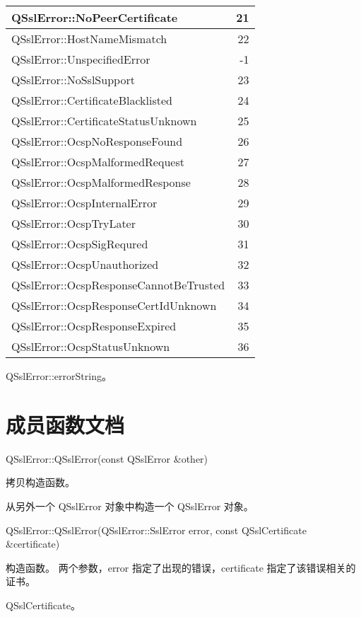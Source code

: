 \begin{longtable}[l]{|l|r|}
\hline
QSslError::NoPeerCertificate &	21 \\ 
\hline
QSslError::HostNameMismatch &	22 \\ 
\hline
QSslError::UnspecifiedError &	-1 \\ 
\hline
QSslError::NoSslSupport 	&23 \\  
\hline
QSslError::CertificateBlacklisted &	24 \\ 
\hline
QSslError::CertificateStatusUnknown &	25 \\ 
\hline
QSslError::OcspNoResponseFound &	26 \\ 
\hline
QSslError::OcspMalformedRequest &	27 \\ 
\hline
QSslError::OcspMalformedResponse &	28 \\ 
\hline
QSslError::OcspInternalError &	29 \\ 
\hline
QSslError::OcspTryLater &	30 \\ 
\hline
QSslError::OcspSigRequred &	31 \\ 
\hline
QSslError::OcspUnauthorized &	32 \\ 
\hline
QSslError::OcspResponseCannotBeTrusted &	33 \\ 
\hline
QSslError::OcspResponseCertIdUnknown &	34 \\ 
\hline
QSslError::OcspResponseExpired& 	35 \\
\hline
QSslError::OcspStatusUnknown &	36 \\ 
\hline 
\end{longtable}

\begin{seeAlso}
QSslError::errorString。
\end{seeAlso}

\section{成员函数文档}

QSslError::QSslError(const QSslError \&other)

拷贝构造函数。

从另外一个 QSslError 对象中构造一个 QSslError 对象。

QSslError::QSslError(QSslError::SslError error, const QSslCertificate \&certificate)

构造函数。
两个参数，error 指定了出现的错误，certificate 指定了该错误相关的证书。

\begin{seeAlso}
QSslCertificate。
\end{seeAlso}

